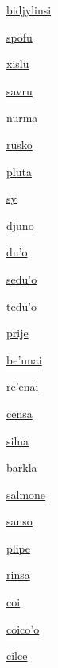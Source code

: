 {\hyperlink{val:bidjylinsi}{bidjylinsi}}{}{}{}

{\hyperlink{val:spofu}{spofu}}{}{}{}

{\hyperlink{val:xislu}{xislu}}{}{}{}

{\hyperlink{val:savru}{savru}}{}{}{}

{\hyperlink{val:nurma}{nurma}}{}{}{}

{\hyperlink{val:rusko}{rusko}}{}{}{}

{\hyperlink{val:pluta}{pluta}}{}{}{}

{\hyperlink{val:sy}{sy}}{}{}{}

{\hyperlink{val:djuno}{djuno}}{}{}{}

{\hyperlink{val:duho}{du'o}}{}{}{}

{\hyperlink{val:seduho}{sedu'o}}{}{}{}

{\hyperlink{val:teduho}{tedu'o}}{}{}{}

{\hyperlink{val:prije}{prije}}{}{}{}

{\hyperlink{val:behunai}{be'unai}}{}{}{}

{\hyperlink{val:rehenai}{re'enai}}{}{}{}

{\hyperlink{val:censa}{censa}}{}{}{}

{\hyperlink{val:silna}{silna}}{}{}{}

{\hyperlink{val:barkla}{barkla}}{}{}{}

{\hyperlink{val:salmone}{salmone}}{}{}{}

{\hyperlink{val:sanso}{sanso}}{}{}{}

{\hyperlink{val:plipe}{plipe}}{}{}{}

{\hyperlink{val:rinsa}{rinsa}}{}{}{}

{\hyperlink{val:coi}{coi}}{}{}{}

{\hyperlink{val:coicoho}{coico'o}}{}{}{}

{\hyperlink{val:cilce}{cilce}}{}{}{}

